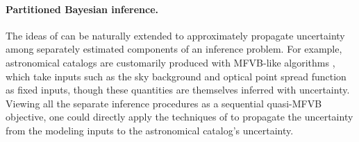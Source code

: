 \paragraph{Partitioned Bayesian inference.}

The ideas of \citep{giordano:2018:covariances} can be naturally extended to
approximately propagate uncertainty among separately estimated components of an
inference problem.  For example, astronomical catalogs are customarily produced
with MFVB-like algorithms \citep{lang:2016:tractor, regier:2019:cataloging},
which take inputs such as the sky background and optical point spread function
as fixed inputs, though these quantities are themselves inferred with
uncertainty.  Viewing all the separate inference procedures as a sequential
quasi-MFVB objective, one could directly apply the techniques of
\citep{giordano:2018:covariances} to propagate the uncertainty from the modeling
inputs to the astronomical catalog's uncertainty.



\newpage





